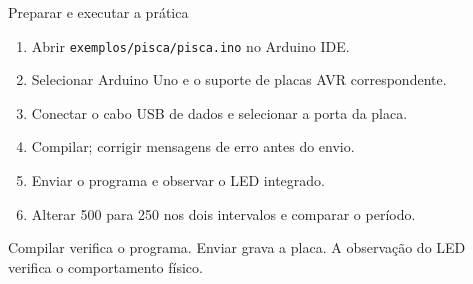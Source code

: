 \begin{frame}[t]{Preparar e executar a prática}
\begin{enumerate}
\item Abrir \texttt{exemplos/pisca/pisca.ino} no Arduino IDE.
\item Selecionar Arduino Uno e o suporte de placas AVR correspondente.
\item Conectar o cabo USB de dados e selecionar a porta da placa.
\item Compilar; corrigir mensagens de erro antes do envio.
\item Enviar o programa e observar o LED integrado.
\item Alterar 500 para 250 nos dois intervalos e comparar o período.
\end{enumerate}
\small Compilar verifica o programa. Enviar grava a placa. A observação do LED verifica o comportamento físico.
\end{frame}
